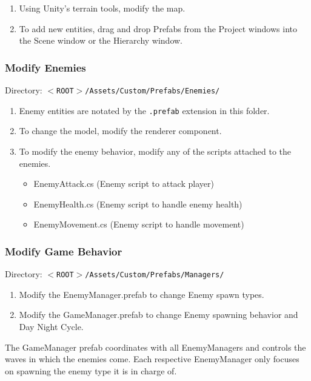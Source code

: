 \documentclass[a4paper]{refart}
\begin{document}
\begin{enumerate}
	\item Using Unity's terrain tools, modify the map.
	\item To add new entities, drag and drop Prefabs from the Project windows into the Scene window or the Hierarchy window.
\end{enumerate}

\subsubsection{Modify Enemies}

Directory: \texttt{$<$ROOT$>$/Assets/Custom/Prefabs/Enemies/}

\begin{enumerate}
	\item Enemy entities are notated by the \texttt{.prefab} extension in this folder.
	\item To change the model, modify the renderer component.
	\item To modify the enemy behavior, modify any of the scripts attached to the enemies.
	\begin{itemize}
		\item EnemyAttack.cs (Enemy script to attack player)
		\item EnemyHealth.cs (Enemy script to handle enemy health)
		\item EnemyMovement.cs (Enemy script to handle movement)
	\end{itemize}
\end{enumerate}

\subsubsection{Modify Game Behavior}

Directory: \texttt{$<$ROOT$>$/Assets/Custom/Prefabs/Managers/}

\begin{enumerate}
	\item Modify the EnemyManager.prefab to change Enemy spawn types.
	\item Modify the GameManager.prefab to change Enemy spawning behavior and Day Night Cycle.
\end{enumerate}

The GameManager prefab coordinates with all EnemyManagers and controls the waves in which the enemies come. Each respective EnemyManager only focuses on spawning the enemy type it is in charge of.
\end{document}

